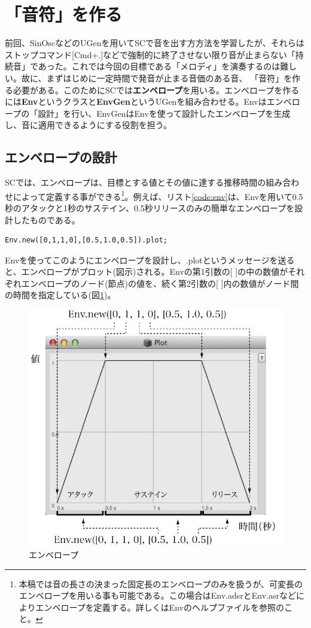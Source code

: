\documentclass{jsarticle}
\begin{document}
\section{「音符」を作る}
前回、SinOscなどのUGenを用いてSCで音を出す方方法を学習したが、それらはストップコマンド[Cmd+.]などで強制的に終了させない限り音が止まらない「持続音」であった。これでは今回の目標である「メロディ」を演奏するのは難しい。故に、まずはじめに一定時間で発音が止まる音価のある音、
「音符」を作る必要がある。このためにSCでは{\bf エンベロープ}を用いる。エンベロープを作るには{\bf Env}というクラスと{\bf EnvGen}というUGenを組み合わせる。Envはエンベロープの「設計」を行い、EnvGenはEnvを使って設計したエンベロープを生成し、音に適用できるようにする役割を担う。

\subsection{エンベロープの設計}
SCでは、エンベロープは、目標とする値とその値に達する推移時間の組み合わせによって定義する事ができる\footnote{本稿では音の長さの決まった固定長のエンベロープのみを扱うが、可変長のエンベロープを用いる事も可能である。この場合はEnv.adsrとEnv.asrなどによりエンベロープを定義する。詳しくはEnvのヘルプファイルを参照のこと。}。例えば、リスト\ref{code:env}は、Envを用いて0.5秒のアタックと1秒のサステイン、0.5秒リリースのみの簡単なエンベロープを設計したものである。
\begin{lstlisting}[caption=エンベロープの設計,label=code:env]
Env.new([0,1,1,0],[0.5,1.0,0.5]).plot;
\end{lstlisting}
Envを使ってこのようにエンベロープを設計し、.plotというメッセージを送ると、エンベロープがプロット(図示)される。Envの第1引数の[ ]の中の数値がそれぞれエンベロープのノード(節点)の値を、続く第2引数の[ ]内の数値がノード間の時間を指定している(図\ref{fig:plot})。

\begin{figure}[htbp]
 \begin{center}
  \includegraphics[scale=0.6]{plot_env.pdf}
 \end{center}
 \caption{エンベロープ}
 \label{fig:plot}
\end{figure}
\end{document}
